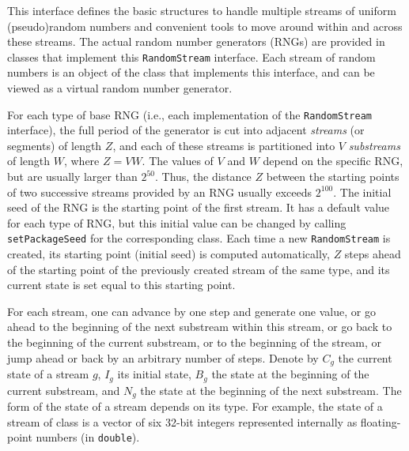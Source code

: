 
This interface defines the basic structures to handle multiple streams
of uniform (pseudo)\-random numbers and convenient
tools to move around within and across these streams.
The actual random number generators (RNGs) are provided in classes
that implement this \texttt{RandomStream} interface.
Each stream of random numbers is an object of the class that implements
this interface, and can be viewed as a virtual random number generator.

For each type of base RNG (i.e., each implementation of the 
\texttt{RandomStream} interface), the full period of the generator
is cut into adjacent {\em streams\/} (or segments) of length $Z$, 
and each of these streams is partitioned into $V$ {\em substreams\/}
of length $W$, where $Z = VW$.
The values of $V$ and $W$ depend on the specific RNG, but are usually
larger than $2^{50}$.
Thus, the distance $Z$ between the starting points of two successive 
streams provided by an RNG usually exceeds $2^{100}$.
The initial seed of the RNG is the starting point of the first stream.  
It has a default value for each type of RNG,
but this initial value can be changed by calling \texttt{setPackageSeed} 
for the corresponding class.
Each time a new \texttt{RandomStream} is created, its starting point
(initial seed) is computed automatically,
$Z$ steps ahead of the starting point of the previously created stream
of the same type, and its current state is set equal to this starting point.

For each stream, one can advance by one step and generate one value,
or go ahead to the beginning of the next substream within this stream, 
or go back to the beginning of the current substream, or to the beginning
of the stream, or jump ahead or back by an arbitrary number of steps.
Denote by $C_g$ the current state of a stream $g$,
$I_g$ its initial state, $B_g$ the state at the beginning of the
current substream, and $N_g$ the state at the beginning of the next substream.
The form of the state of a stream depends on its type.
For example, the state of a stream of class  is a vector
of six 32-bit integers represented internally as floating-point numbers
(in \texttt{double}).

